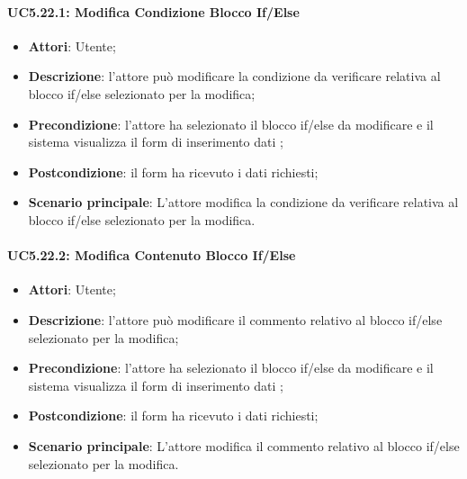 \begin{itemize}
\begin{itemize}
\begin{itemize}
\begin{itemize}
\paragraph{UC5.22.1: Modifica Condizione Blocco If/Else}
\label{UC5.22.1}
\begin{itemize}
	\item \textbf{Attori}: Utente;
	\item \textbf{Descrizione}: l'attore può modificare la condizione da verificare relativa al blocco if/else selezionato per la modifica;
	\item \textbf{Precondizione}: l'attore ha selezionato il blocco if/else da modificare e il sistema visualizza il form di inserimento dati ;
	\item \textbf{Postcondizione}: il form ha ricevuto i dati richiesti;
	\item \textbf{Scenario principale}: L'attore modifica la condizione da verificare relativa al blocco if/else selezionato per la modifica.
\end{itemize}

\paragraph{UC5.22.2: Modifica Contenuto Blocco If/Else}
\label{UC5.22.2}
\begin{itemize}
\item \textbf{Attori}: Utente;
	\item \textbf{Descrizione}: l'attore può modificare il commento relativo al blocco if/else selezionato per la modifica;
	\item \textbf{Precondizione}: l'attore ha selezionato il blocco if/else da modificare e il sistema visualizza il form di inserimento dati ;
	\item \textbf{Postcondizione}: il form ha ricevuto i dati richiesti;
	\item \textbf{Scenario principale}: L'attore modifica il commento relativo al blocco if/else selezionato per la modifica.
\end{itemize}


\end{itemize}
\end{itemize}
\end{itemize}
\end{itemize}
